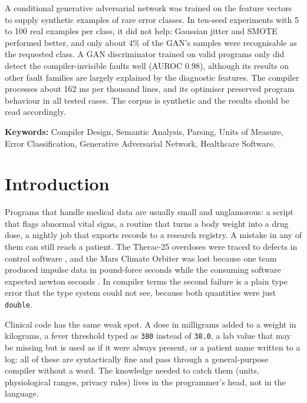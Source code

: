 \documentclass[12pt,a4paper]{article}
\newcommand{\code}[1]{\texttt{#1}}
\newcommand{\MsPerKloc}{162}
\begin{document}
A conditional generative adversarial network was trained on the feature vectors to supply synthetic examples of rare error classes.
In ten-seed experiments with 5 to 100 real examples per class, it did not help: Gaussian jitter and SMOTE performed better, and only
about 4\% of the GAN's samples were recognisable as the requested class. A GAN discriminator trained on valid programs only did
detect the compiler-invisible faults well (AUROC 0.98), although its results on other fault families are largely explained by the diagnostic features.
The compiler processes about \MsPerKloc{} ms per thousand lines, and its optimiser preserved program behaviour in all tested cases.
The corpus is synthetic and the results should be read accordingly.

\vspace{0.4em}
\textbf{Keywords:}
Compiler Design, Semantic Analysis, Parsing, Units of Measure, Error Classification, Generative Adversarial Network,
Healthcare Software.

\newpage

\section{Introduction}

Programs that handle medical data are usually small and unglamorous: a script that flags abnormal vital signs, a
routine that turns a body weight into a drug dose, a nightly job that exports records to a research registry. A
mistake in any of them can still reach a patient. The Therac-25 overdoses were traced to defects in control
software \cite{leveson1993}, and the Mars Climate Orbiter was lost because one team produced impulse data in
pound-force seconds while the consuming software expected newton seconds \cite{mco1999}. In compiler terms the second
failure is a plain type error that the type system could not see, because both quantities were just \code{double}.

Clinical code has the same weak spot. A dose in milligrams added to a weight in kilograms, a fever threshold typed as
\code{380} instead of \code{38.0}, a lab value that may be missing but is used as if it were always present, or a
patient name written to a log: all of these are syntactically fine and pass through a general-purpose compiler without
a word. The knowledge needed to catch them (units, physiological ranges, privacy rules) lives in the programmer's
head, not in the language.
\end{document}
